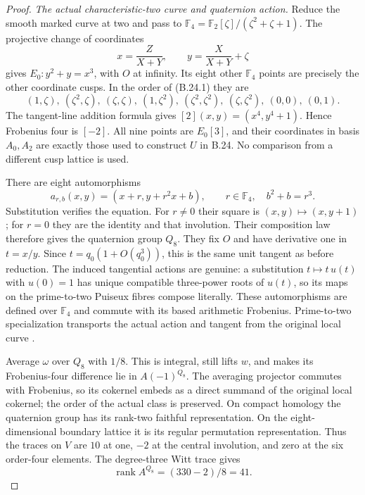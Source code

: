 \begin{proof}
\emph{The actual characteristic-two curve and quaternion action.}
Reduce the smooth marked curve at two and pass to
$\mathbb F_4=\mathbb F_2[\zeta]/(\zeta^2+\zeta+1)$.
The projective change of coordinates
\[
             x=\frac Z{X+Y},\qquad
             y=\frac X{X+Y}+\zeta
                                                               \tag{B.35.10}
\]
gives $E_0:y^2+y=x^3$, with $O$ at infinity.
Its eight other $\mathbb F_4$ points are precisely the
other coordinate cusps. In the order of (B.24.1) they are
\[
 (1,\zeta),\ (\zeta^2,\zeta),\ (\zeta,\zeta),\
 (1,\zeta^2),\ (\zeta^2,\zeta^2),\ (\zeta,\zeta^2),\
 (0,0),\ (0,1).
                                                               \tag{B.35.11}
\]
The tangent-line addition formula gives
$[2](x,y)=(x^4,y^4+1)$. Hence Frobenius four is $[-2]$.
All nine points are $E_0[3]$, and their coordinates in
basis $A_0,A_2$ are exactly those used to construct $U$
in B.24. No comparison from a different cusp lattice is used.

There are eight automorphisms
\[
 a_{r,b}(x,y)=(x+r,y+r^2x+b),\qquad
 r\in\mathbb F_4,\quad b^2+b=r^3.                            \tag{B.35.12}
\]
Substitution verifies the equation. For $r\ne0$ their
square is $(x,y)\mapsto(x,y+1)$; for $r=0$ they are
the identity and that involution. Their composition law
therefore gives the quaternion group $Q_8$.
They fix $O$ and have derivative one in $t=x/y$.
Since $t=q_0(1+O(q_0^3))$, this is the same unit tangent
as before reduction.
The induced tangential actions are genuine: a substitution
$t\mapsto t\,u(t)$ with $u(0)=1$ has unique compatible
three-power roots of $u(t)$, so its maps on the prime-to-two
Puiseux fibres compose literally.
These automorphisms are defined over $\mathbb F_4$ and
commute with its based arithmetic Frobenius.
Prime-to-two specialization transports the actual action
and tangent from the original local curve
\citep[XIII, \S\S2.9--2.12]{BSGA1}.

Average $\omega$ over $Q_8$ with $1/8$. This is integral,
still lifts $w$, and makes its Frobenius-four difference
lie in $A(-1)^{Q_8}$. The averaging projector commutes
with Frobenius, so its cokernel embeds as a direct summand
of the original local cokernel; the order of the actual
class is preserved.
On compact homology the quaternion group has its
rank-two faithful representation. On the eight-dimensional
boundary lattice it is its regular permutation representation.
Thus the traces on $V$ are $10$ at one, $-2$ at the central
involution, and zero at the six order-four elements.
The degree-three Witt trace gives
\[
                    \operatorname{rank}A^{Q_8}
                              =(330-2)/8=41.                  \tag{B.35.13}
\]


\end{proof}
